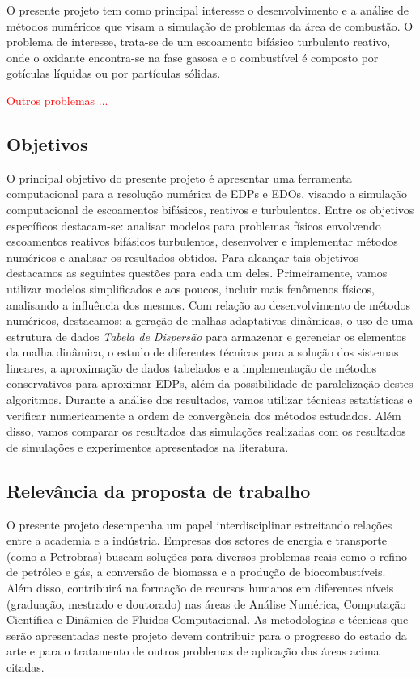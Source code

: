 \documentclass[12pt, brazil]{article}
\begin{document}
O presente projeto tem como principal interesse o desenvolvimento e a análise de métodos numéricos que visam a simulação de problemas da área de combustão. O problema de interesse, trata-se de um escoamento bifásico turbulento reativo, onde o oxidante encontra-se na fase gasosa e o combustível é composto por gotículas líquidas ou por partículas sólidas. 

\textcolor{red}{Outros problemas ...}

\subsection{Objetivos}

O principal objetivo do presente projeto é apresentar uma ferramenta computacional para a resolução numérica de EDPs e EDOs, visando a simulação computacional de escoamentos bifásicos, reativos e turbulentos. Entre os objetivos específicos destacam-se: analisar modelos para problemas físicos envolvendo escoamentos reativos bifásicos turbulentos, desenvolver e implementar métodos numéricos e analisar os resultados obtidos. Para alcançar tais objetivos destacamos as seguintes questões para cada um deles. Primeiramente, vamos utilizar modelos simplificados e aos poucos, incluir mais fenômenos físicos, analisando a influência dos mesmos. Com relação ao desenvolvimento de métodos numéricos, destacamos: a geração de malhas adaptativas dinâmicas, o uso de uma estrutura de dados {\em Tabela de Dispersão} para armazenar e gerenciar os elementos da malha dinâmica, o estudo de diferentes técnicas para a solução dos sistemas lineares, a aproximação de dados tabelados e a implementação de métodos conservativos para aproximar EDPs, além da possibilidade de paralelização destes algoritmos. Durante a análise dos resultados, vamos utilizar técnicas estatísticas e verificar numericamente a ordem de convergência dos métodos estudados. Além disso, vamos comparar os resultados das simulações realizadas com os resultados de simulações e experimentos apresentados na literatura.

\subsection{Relevância da proposta de trabalho}

O presente projeto desempenha um papel interdisciplinar estreitando relações entre a academia e a indústria. Empresas dos setores de energia e transporte (como a Petrobras) buscam soluções para diversos problemas reais como o refino de petróleo e gás, a conversão de biomassa e a produção de biocombustíveis. Além disso, contribuirá na formação de recursos humanos em diferentes níveis (graduação, mestrado e doutorado) nas áreas de Análise Numérica, Computação Científica e Dinâmica de Fluidos Computacional. As metodologias e técnicas que serão apresentadas neste projeto devem contribuir para o progresso do estado da arte e para o tratamento de outros problemas de aplicação das áreas acima citadas.  
\end{document}

